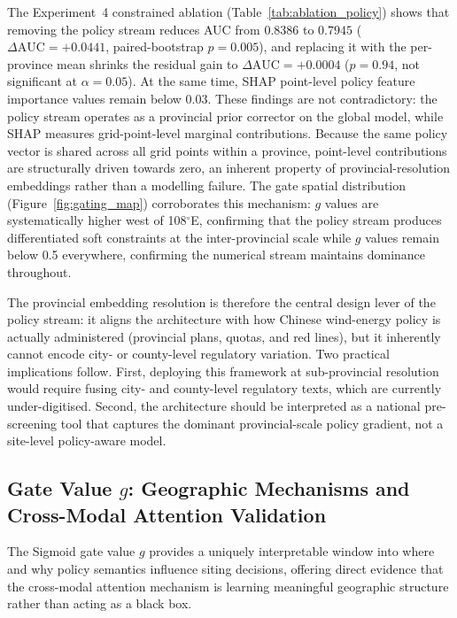 \documentclass[12pt, a4paper]{article}
\begin{document}
The Experiment~4 constrained ablation
(Table~\ref{tab:ablation_policy}) shows that removing the policy
stream reduces AUC from $0.8386$ to $0.7945$
($\Delta\text{AUC}=+0.0441$, paired-bootstrap $p=0.005$),
and replacing it with the per-province mean shrinks the
residual gain to
$\Delta\text{AUC}=+0.0004$ ($p=0.94$, not significant at
$\alpha=0.05$). At the same time, SHAP point-level policy
feature importance values remain below $0.03$. These findings
are not contradictory: the policy stream operates as a
provincial prior corrector on the global model, while SHAP
measures grid-point-level marginal contributions. Because the
same policy vector is shared across all grid points within a
province, point-level contributions are structurally driven
towards zero, an inherent property of provincial-resolution
embeddings rather than a modelling failure. The gate spatial
distribution (Figure~\ref{fig:gating_map}) corroborates this
mechanism: $g$ values are systematically higher west of
108$^\circ$E, confirming that the policy stream produces
differentiated soft constraints at the inter-provincial scale
while $g$ values remain below 0.5 everywhere, confirming the
numerical stream maintains dominance throughout.

The provincial embedding resolution is therefore the central
design lever of the policy stream: it aligns the architecture
with how Chinese wind-energy policy is actually administered
(provincial plans, quotas, and red lines), but it inherently
cannot encode city- or county-level regulatory variation. Two
practical implications follow. First, deploying this
framework at sub-provincial resolution would require fusing
city- and county-level regulatory texts, which are currently
under-digitised. Second, the architecture should be
interpreted as a national pre-screening tool that captures
the dominant provincial-scale policy gradient, not a
site-level policy-aware model.

\subsection{Gate Value \texorpdfstring{$g$}{g}: Geographic Mechanisms and
Cross-Modal Attention Validation}
\label{sec:gating}

The Sigmoid gate value $g$ provides a uniquely interpretable
window into where and why policy semantics influence siting
decisions, offering direct evidence that the cross-modal
attention mechanism is learning meaningful geographic
structure rather than acting as a black box.
\end{document}
